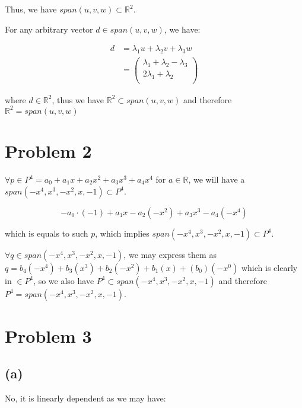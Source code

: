 \documentclass[11pt]{article}
\begin{document}
Thus, we have $span(u, v, w) \subset \mathbb{R}^2$.

For any arbitrary vector $d \in span(u, v, w)$, we have:

\begin{align*}
    d &= \lambda_1 u + \lambda_2 v + \lambda_3 w \\
    &= \begin{pmatrix}
        \lambda_1 + \lambda_2 - \lambda_3 \\
        2\lambda_1 + \lambda_2\\
    \end{pmatrix}
\end{align*}

where $d \in \mathbb{R}^2$, thus we have $\mathbb{R}^2 \subset span(u, v, w)$ and therefore $\mathbb{R}^2 = span(u, v, w)$

\section*{Problem 2}

$\forall p \in P^4 = a_0 + a_1 x + a_2 x^2 + a_3 x^3 + a_4 x^4$ for $a \in \mathbb{R}$, we will have a $span(-x^4, x^3, -x^2, x, -1) \subset P^4$.

\begin{equation*}
    -a_0 \cdot (-1) + a_1 x - a_2 (-x^2) + a_3 x^3 - a_4 (-x^4)
\end{equation*}

which is equals to such $p$, which implies $span(-x^4, x^3, -x^2, x, -1) \subset P^4$.\newline

\noindent $\forall q \in span(-x^4, x^3, -x^2, x, -1)$, we may express them as $q = b_4(-x^4) + b_3(x^3) + b_2(-x^2) + b_1(x) + (b_0)(- x^0)$ which is clearly in $\in P^4$, so we also have $P^4 \subset span(-x^4, x^3, -x^2, x, -1)$ and therefore $P^4 = span(-x^4, x^3, -x^2, x, -1)$.

\section*{Problem 3}

\subsection*{(a)}

No, it is linearly dependent as we may have:

\end{document}

